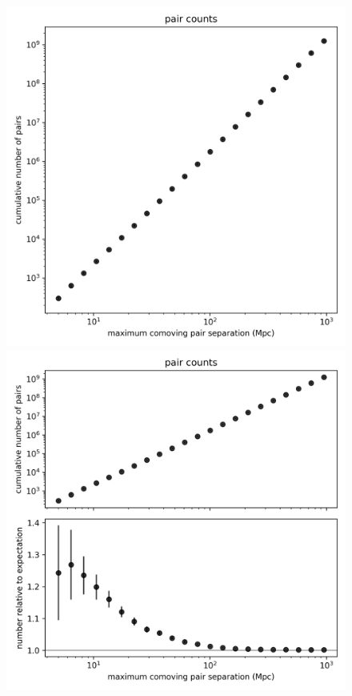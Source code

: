 \documentclass[modern]{aastex631}
\newlength{\figurewidth}
\begin{document}
\begin{figure}[t!]
  \begin{mdframed}
  \color{captiongray}
  \begin{center}
    \includegraphics[width=\figurewidth]{notebooks/cumulativeDD.png}
    \includegraphics[width=\figurewidth]{notebooks/cumulativeDD_DR.png}

\end{center}
\end{mdframed}
\end{figure}
\end{document}

